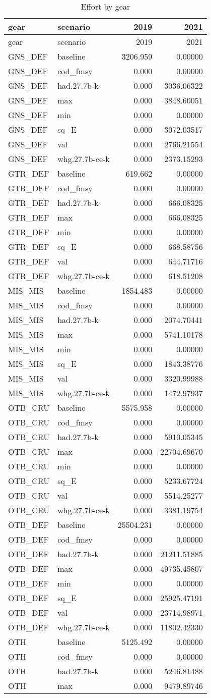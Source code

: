 \documentclass[
]{article}
\begin{document}
\begin{longtable}[]{@{}llrr@{}}
\caption{Effort by gear}\tabularnewline
\toprule
gear & scenario & 2019 & 2021\tabularnewline
\midrule
\endfirsthead
\toprule
gear & scenario & 2019 & 2021\tabularnewline
\midrule
\endhead
GNS\_DEF & baseline & 3206.959 & 0.00000\tabularnewline
GNS\_DEF & cod\_fmsy & 0.000 & 0.00000\tabularnewline
GNS\_DEF & had.27.7b-k & 0.000 & 3036.06322\tabularnewline
GNS\_DEF & max & 0.000 & 3848.60051\tabularnewline
GNS\_DEF & min & 0.000 & 0.00000\tabularnewline
GNS\_DEF & sq\_E & 0.000 & 3072.03517\tabularnewline
GNS\_DEF & val & 0.000 & 2766.21554\tabularnewline
GNS\_DEF & whg.27.7b-ce-k & 0.000 & 2373.15293\tabularnewline
GTR\_DEF & baseline & 619.662 & 0.00000\tabularnewline
GTR\_DEF & cod\_fmsy & 0.000 & 0.00000\tabularnewline
GTR\_DEF & had.27.7b-k & 0.000 & 666.08325\tabularnewline
GTR\_DEF & max & 0.000 & 666.08325\tabularnewline
GTR\_DEF & min & 0.000 & 0.00000\tabularnewline
GTR\_DEF & sq\_E & 0.000 & 668.58756\tabularnewline
GTR\_DEF & val & 0.000 & 644.71716\tabularnewline
GTR\_DEF & whg.27.7b-ce-k & 0.000 & 618.51208\tabularnewline
MIS\_MIS & baseline & 1854.483 & 0.00000\tabularnewline
MIS\_MIS & cod\_fmsy & 0.000 & 0.00000\tabularnewline
MIS\_MIS & had.27.7b-k & 0.000 & 2074.70441\tabularnewline
MIS\_MIS & max & 0.000 & 5741.10178\tabularnewline
MIS\_MIS & min & 0.000 & 0.00000\tabularnewline
MIS\_MIS & sq\_E & 0.000 & 1843.38776\tabularnewline
MIS\_MIS & val & 0.000 & 3320.99988\tabularnewline
MIS\_MIS & whg.27.7b-ce-k & 0.000 & 1472.97937\tabularnewline
OTB\_CRU & baseline & 5575.958 & 0.00000\tabularnewline
OTB\_CRU & cod\_fmsy & 0.000 & 0.00000\tabularnewline
OTB\_CRU & had.27.7b-k & 0.000 & 5910.05345\tabularnewline
OTB\_CRU & max & 0.000 & 22704.69670\tabularnewline
OTB\_CRU & min & 0.000 & 0.00000\tabularnewline
OTB\_CRU & sq\_E & 0.000 & 5233.67724\tabularnewline
OTB\_CRU & val & 0.000 & 5514.25277\tabularnewline
OTB\_CRU & whg.27.7b-ce-k & 0.000 & 3381.19754\tabularnewline
OTB\_DEF & baseline & 25504.231 & 0.00000\tabularnewline
OTB\_DEF & cod\_fmsy & 0.000 & 0.00000\tabularnewline
OTB\_DEF & had.27.7b-k & 0.000 & 21211.51885\tabularnewline
OTB\_DEF & max & 0.000 & 49735.45807\tabularnewline
OTB\_DEF & min & 0.000 & 0.00000\tabularnewline
OTB\_DEF & sq\_E & 0.000 & 25925.47191\tabularnewline
OTB\_DEF & val & 0.000 & 23714.98971\tabularnewline
OTB\_DEF & whg.27.7b-ce-k & 0.000 & 11802.42330\tabularnewline
OTH & baseline & 5125.492 & 0.00000\tabularnewline
OTH & cod\_fmsy & 0.000 & 0.00000\tabularnewline
OTH & had.27.7b-k & 0.000 & 5246.81488\tabularnewline
OTH & max & 0.000 & 9479.89746\tabularnewline

\end{longtable}
\end{document}
